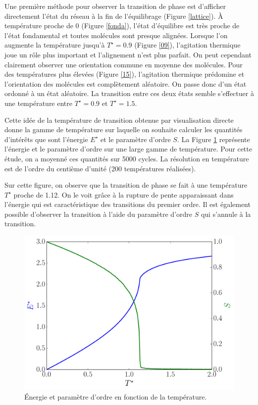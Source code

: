 \documentclass[11pt,a4paper]{article}
\numberwithin{equation}{section}
\begin{document}
Une première méthode pour observer la transition de phase est d'afficher directement l'état du réseau à la fin de l'équilibrage (Figure \ref{lattice}). À température proche de 0 (Figure \ref{fonda}), l'état d'équilibre est très proche de l'état fondamental et toutes molécules sont presque alignées. Lorsque l'on augmente la température jusqu'à $T^\star = 0.9$ (Figure \ref{09}), l'agitation thermique joue un rôle plus important et l'alignement n'est plus parfait. On peut cependant clairement observer une orientation commune en moyenne des molécules. Pour des températures plus élevées (Figure \ref{15}), l'agitation thermique prédomine et l'orientation des molécules est complètement aléatoire.
On passe donc d'un état ordonné à un état aléatoire. La transition entre ces deux états semble s'effectuer à une température entre $T^\star = 0.9$ et $T^\star = 1.5$. 
\medskip

Cette idée de la température de transition obtenue par visualisation directe donne la gamme de température sur laquelle on souhaite calculer les quantités d'intérêts que sont l'énergie $E^\star$ et le paramètre d'ordre $S$. La Figure \ref{global} représente l'énergie et le paramètre d'ordre sur une large gamme de température. Pour cette étude, on a moyenné ces quantités sur 5000 cycles. La résolution en température est de l'ordre du centième d'unité (200 températures réalisées).
\medskip

Sur cette figure, on observe que la transition de phase se fait à une température $T^\star$ proche de 1.12. On le voit grâce à la rupture de pente apparaissant dans l'énergie qui est caractéristique des transitions du premier ordre. Il est également possible d'observer la transition à l'aide du paramètre d'ordre $S$ qui s'annule à la transition.

\begin{figure}[h!]
    \centering	    
	\includegraphics[scale=0.6]{figures/global.pdf}
    \caption{Énergie et paramètre d'ordre en fonction de la température.}
    	\label{global} 
\end{figure}
\end{document}
